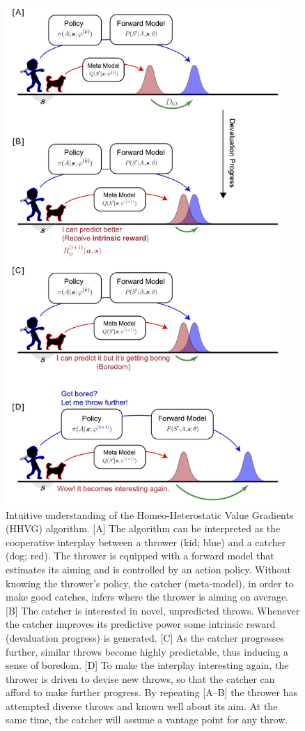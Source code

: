 \documentclass[utf8]{frontiersSCNS}
\begin{document}
\begin{figure}[bh!]
	\begin{center}
	\includegraphics[width=10.5cm]{algo-intuition-v1}
	\end{center}
	\caption{Intuitive understanding of the Homeo-Heterostatic Value Gradients (HHVG) algorithm. [A] The algorithm can be interpreted as the cooperative interplay between a thrower (kid; blue) and a catcher (dog; red). The thrower is equipped with a forward model that estimates its aiming and is controlled by an action policy. Without knowing the thrower's policy, the catcher (meta-model), in order to make good catches, infers where the thrower is aiming on average. [B] The catcher is interested in novel, unpredicted throws. Whenever the catcher improves its predictive power some intrinsic reward (devaluation progress) is generated. [C] As the catcher progresses further, similar throws become highly predictable, thus inducing a sense of boredom. [D] To make the interplay interesting again, the thrower is driven to devise new throws, so that the catcher can afford to make further progress. By repeating [A--B] the thrower has attempted diverse throws and known well about its aim. At the same time, the catcher will assume a vantage point for any throw.}
	\label{fig:intuition}
\end{figure}
\end{document}

